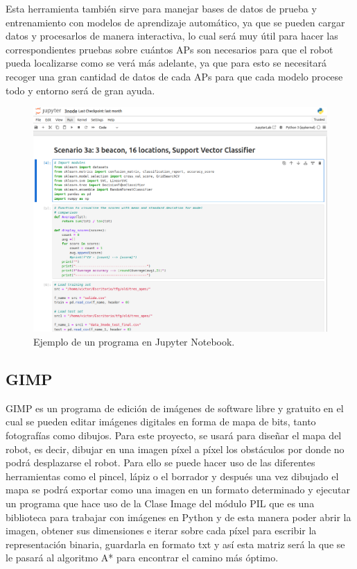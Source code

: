 Esta herramienta también sirve para manejar bases de datos de prueba y entrenamiento con modelos de aprendizaje automático, ya que se pueden cargar datos y procesarlos de manera interactiva, lo cual será muy útil para hacer las correspondientes pruebas sobre cuántos APs son necesarios para que el robot pueda localizarse como se verá más adelante, ya que para esto se necesitará recoger una gran cantidad de datos de cada APs para que cada modelo procese todo y entorno será de gran ayuda.




\begin{figure}[H]
  \centering
  \includegraphics[scale=0.4]{figs/jup2} %
  \caption{Ejemplo de un programa en Jupyter Notebook.}
  \label{fig:jup2}
\end{figure}

\subsection{GIMP}
\label{subsec:gimp}

GIMP es un programa de edición de imágenes de software libre y gratuito en el cual se pueden editar imágenes digitales en forma de mapa de bits, tanto fotografías como dibujos. Para este proyecto, se usará para diseñar el mapa del robot, es decir, dibujar en una imagen píxel a píxel los obstáculos por donde no podrá desplazarse el robot. Para ello se puede hacer uso de las diferentes herramientas como el pincel, lápiz o el borrador y después una vez dibujado el mapa se podrá exportar como una imagen en un formato determinado y ejecutar un programa que hace uso de la Clase Image del módulo PIL que es una biblioteca para trabajar con imágenes en Python y de esta manera poder abrir la imagen, obtener sus dimensiones e iterar sobre cada píxel para escribir la representación binaria, guardarla en formato txt y así esta matriz será la que se le pasará al algoritmo A* para encontrar el camino más óptimo.


